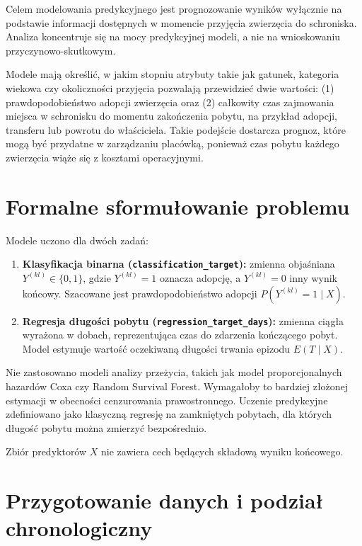 Celem modelowania predykcyjnego jest prognozowanie wyników wyłącznie na podstawie informacji dostępnych w momencie przyjęcia zwierzęcia do schroniska. Analiza koncentruje się na mocy predykcyjnej modeli, a nie na wnioskowaniu przyczynowo-skutkowym.

Modele mają określić, w jakim stopniu atrybuty takie jak gatunek, kategoria wiekowa czy okoliczności przyjęcia pozwalają przewidzieć dwie wartości: (1) prawdopodobieństwo adopcji zwierzęcia oraz (2) całkowity czas zajmowania miejsca w schronisku do momentu zakończenia pobytu, na przykład adopcji, transferu lub powrotu do właściciela. Takie podejście dostarcza prognoz, które mogą być przydatne w zarządzaniu placówką, ponieważ czas pobytu każdego zwierzęcia wiąże się z kosztami operacyjnymi.

\section{Formalne sformułowanie problemu}
\label{sec:formalne-sformulowanie-problemu}

Modele uczono dla dwóch zadań:

\begin{enumerate}\itemsep2pt
\item \textbf{Klasyfikacja binarna (\texttt{classification\_target}):} zmienna objaśniana $Y^{(kl)} \in \{0,1\}$, gdzie $Y^{(kl)}=1$ oznacza adopcję, a $Y^{(kl)}=0$ inny wynik końcowy. Szacowane jest prawdopodobieństwo adopcji $P(Y^{(kl)}=1\mid X)$.
\item \textbf{Regresja długości pobytu (\texttt{regression\_target\_days}):} zmienna ciągła wyrażona w dobach, reprezentująca czas do zdarzenia kończącego pobyt. Model estymuje wartość oczekiwaną długości trwania epizodu $E(T\mid X)$.
\end{enumerate}

Nie zastosowano modeli analizy przeżycia, takich jak model proporcjonalnych hazardów Coxa czy Random Survival Forest. Wymagałoby to bardziej złożonej estymacji w obecności cenzurowania prawostronnego. Uczenie predykcyjne zdefiniowano jako klasyczną regresję na zamkniętych pobytach, dla których długość pobytu można zmierzyć bezpośrednio.

Zbiór predyktorów $X$ nie zawiera cech będących składową wyniku końcowego.

\section{Przygotowanie danych i podział chronologiczny}
\label{sec:przygotowanie-danych-podzial}

